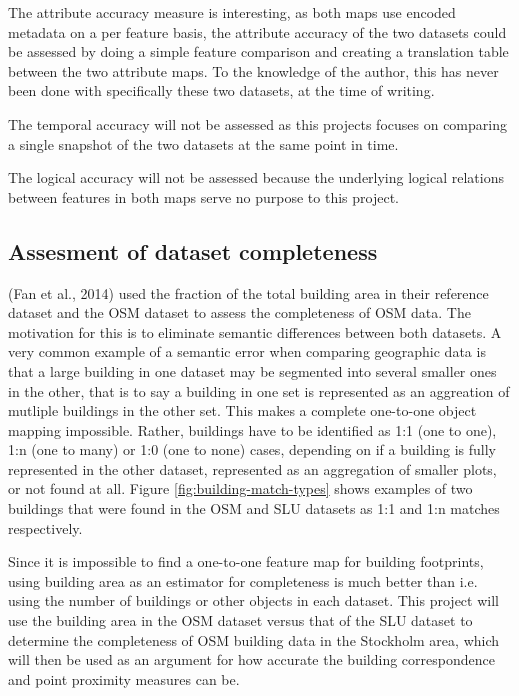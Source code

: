 \documentclass[a4paper]{article}
\begin{document}
The attribute accuracy measure is interesting, as both maps use encoded metadata on a per feature basis, the attribute accuracy of the two datasets could be assessed by doing a simple feature comparison and creating a translation table between the two attribute maps. To the knowledge of the author, this has never been done with specifically these two datasets, at the time of writing.

The temporal accuracy will not be assessed as this projects focuses on comparing a single snapshot of the two datasets at the same point in time.

The logical accuracy will not be assessed because the underlying logical relations between features in both maps serve no purpose to this project.

\subsection{Assesment of dataset completeness}

(Fan et al., 2014) used the fraction of the total building area in their reference dataset and the OSM dataset to assess the completeness of OSM data.
The motivation for this is to eliminate semantic differences between both datasets.
A very common example of a semantic error when comparing geographic data is that a large building in one dataset may be segmented into several smaller ones in the other, that is to say a building in one set is represented as an aggreation of mutliple buildings in the other set.
This makes a complete one-to-one object mapping impossible.
Rather, buildings have to be identified as 1:1 (one to one), 1:n (one to many) or 1:0 (one to none) cases, depending on if a building is fully represented in the other dataset, represented as an aggregation of smaller plots, or not found at all.
Figure \ref{fig:building-match-types} shows examples of two buildings that were found in the OSM and SLU datasets as 1:1 and 1:n matches respectively.

Since it is impossible to find a one-to-one feature map for building footprints, using building area as an estimator for completeness is much better than i.e. using the number of buildings or other objects in each dataset.
This project will use the building area in the OSM dataset versus that of the SLU dataset to determine the completeness of OSM building data in the Stockholm area, which will then be used as an argument for how accurate the building correspondence and point proximity measures can be.
\end{document}
